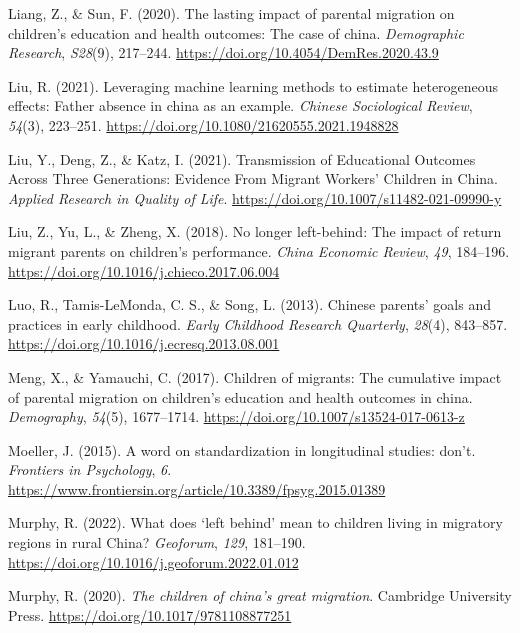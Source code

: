 \documentclass[
  man,floatsintext]{apa7}
\newlength{\cslhangindent}
\newlength{\cslentryspacingunit} %
\newenvironment{CSLReferences}[2] %
 {%
  \setlength{\parindent}{0pt}
  \ifodd #1
  \let\oldpar\par
  \def\par{\hangindent=\cslhangindent\oldpar}
  \fi
  \setlength{\parskip}{#2\cslentryspacingunit}
 }%
 {}
\begin{document}
\begin{CSLReferences}{1}{0}
\leavevmode{}%
Liang, Z., \& Sun, F. (2020). The lasting impact of parental migration on children's education and health outcomes: The case of china. \emph{Demographic Research}, \emph{S28}(9), 217--244. \url{https://doi.org/10.4054/DemRes.2020.43.9}

\leavevmode{}%
Liu, R. (2021). Leveraging machine learning methods to estimate heterogeneous effects: Father absence in china as an example. \emph{Chinese Sociological Review}, \emph{54}(3), 223--251. \url{https://doi.org/10.1080/21620555.2021.1948828}

\leavevmode{}%
Liu, Y., Deng, Z., \& Katz, I. (2021). Transmission of Educational Outcomes Across Three Generations: Evidence From Migrant Workers{'} Children in China. \emph{Applied Research in Quality of Life}. \url{https://doi.org/10.1007/s11482-021-09990-y}

\leavevmode{}%
Liu, Z., Yu, L., \& Zheng, X. (2018). No longer left-behind: The impact of return migrant parents on children's performance. \emph{China Economic Review}, \emph{49}, 184--196. \url{https://doi.org/10.1016/j.chieco.2017.06.004}

\leavevmode{}%
Luo, R., Tamis-LeMonda, C. S., \& Song, L. (2013). Chinese parents{'} goals and practices in early childhood. \emph{Early Childhood Research Quarterly}, \emph{28}(4), 843--857. \url{https://doi.org/10.1016/j.ecresq.2013.08.001}

\leavevmode{}%
Meng, X., \& Yamauchi, C. (2017). Children of migrants: The cumulative impact of parental migration on children{'}s education and health outcomes in china. \emph{Demography}, \emph{54}(5), 1677--1714. \url{https://doi.org/10.1007/s13524-017-0613-z}

\leavevmode{}%
Moeller, J. (2015). A word on standardization in longitudinal studies: don't. \emph{Frontiers in Psychology}, \emph{6}. \url{https://www.frontiersin.org/article/10.3389/fpsyg.2015.01389}

\leavevmode{}%
Murphy, R. (2022). What does {`}left behind{'} mean to children living in migratory regions in rural China? \emph{Geoforum}, \emph{129}, 181--190. \url{https://doi.org/10.1016/j.geoforum.2022.01.012}

\leavevmode{}%
Murphy, R. (2020). \emph{The children of china{'}s great migration}. Cambridge University Press. \url{https://doi.org/10.1017/9781108877251}


\end{CSLReferences}
\end{document}
